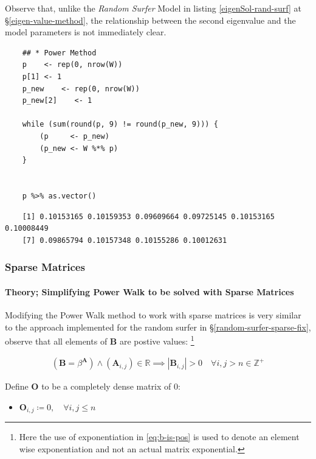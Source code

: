 \documentclass[11pt, twoside]{report}
\begin{document}
Observe that, unlike the \emph{Random Surfer} Model in listing \ref{eigenSol-rand-surf} at \S \ref{eigen-value-method}, the relationship between the second eigenvalue and the model parameters is not immediately clear.


\begin{tcolorbox}
    \begin{verbatim}
    ## * Power Method
    p    <- rep(0, nrow(W))
    p[1] <- 1
    p_new    <- rep(0, nrow(W))
    p_new[2]    <- 1

    while (sum(round(p, 9) != round(p_new, 9))) {
        (p     <- p_new)
        (p_new <- W %*% p)
    }


    p %>% as.vector()
    \end{verbatim}
\tcblower
    \begin{verbatim}
    [1] 0.10153165 0.10159353 0.09609664 0.09725145 0.10153165 0.10008449
    [7] 0.09865794 0.10157348 0.10155286 0.10012631
    \end{verbatim}
\end{tcolorbox}

\subsubsection{Sparse Matrices}
\label{sec:org5192cbb}
\paragraph{Theory; Simplifying Power Walk to be solved with Sparse Matrices}
\label{sec:org82fb181}

Modifying the Power Walk method to work with sparse matrices is very similar to the approach implemented for the random surfer in \S \ref{random-surfer-sparse-fix}, observe that all elements of \(\mathbf{B}\) are postive values: \footnote{Here the use of exponentiation in \eqref{eq:b-is-pos} is used to denote an element wise exponentiation and not an actual matrix exponential.}

\begin{align}
   \left( \mathbf{B} = \beta^{\mathbf{A}} \right)\wedge \left( \mathbf{A}_{i, j}\right)\in \mathbb{R}  \implies  \left\lvert \mathbf{B}_{i, j} \right\rvert > 0 \quad \forall i,j>n\in \mathbb{Z}^+ \label{eq:b-is-pos}
\end{align}




Define \(\mathbf{O}\) to be a completely dense matrix of 0:

\begin{itemize}
\item \(\mathbf{O}_{i, j} \coloneqq 0, \quad \forall i,j\leq n \)
\end{itemize}
\end{document}
